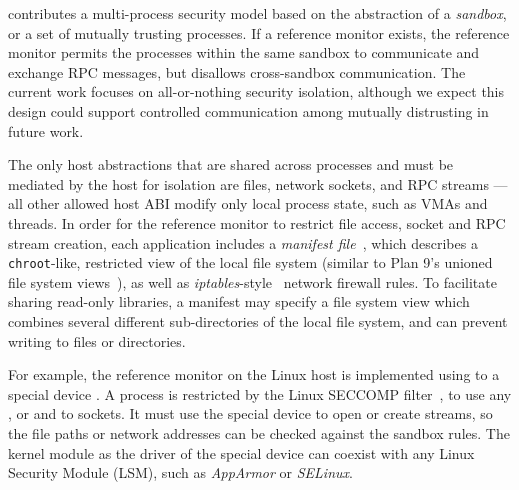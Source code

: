 \graphene{} contributes a multi-process security model 
based on the abstraction of a \emph{sandbox},
or a set of mutually trusting processes.
If a reference monitor exists, the reference monitor permits the processes within the same sandbox to communicate and exchange RPC messages, but disallows cross-sandbox communication.
The current work focuses on all-or-nothing security isolation, although we expect
this design could support
controlled communication among mutually distrusting \liboses{}
in future work.

The only host abstractions that are shared across processes and must be mediated by the host for isolation are files, network sockets, and RPC streams
--- all other allowed host ABI modify only local process state, such as VMAs and threads.
In order for the reference monitor to restrict file access, socket and RPC stream creation,
each application includes a \emph{manifest file}~\cite{hunt07rethink},
which describes a {\tt chroot}-like, restricted view of the local 
file system (similar to Plan 9's unioned file system views~\cite{pike90plan9}),
as well as \emph{iptables}-style~\cite{iptablesman} network firewall rules.
To facilitate sharing read-only libraries, a manifest may specify a file system view which combines several different sub-directories of the local file system, and can prevent writing to files or directories.


For example, the \graphene{} reference monitor on the Linux host is implemented using  to a special device .
A process is restricted by the Linux SECCOMP filter~\cite{seccomp}, to use any , or  and  to sockets.
It must use the \graphene{} special device to open or create streams, so the file paths or network addresses can be checked against the sandbox rules. The kernel module as the driver of the \graphene{} special device can coexist with any Linux Security Module (LSM), such as \emph{AppArmor} or \emph{SELinux}.


